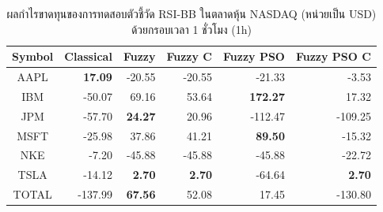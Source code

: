 \begin{table}[!htb]
    \centering
    \begin{tabular}{crrrrr}
        \hline
        \textbf{Symbol} & \textbf{Classical} & \textbf{Fuzzy} & \textbf{Fuzzy C} & \textbf{Fuzzy PSO} & \textbf{Fuzzy PSO C} \\ \hline
        AAPL            & \textbf{17.09}     & -20.55         & -20.55           & -21.33             & -3.53                \\ \hline
        IBM             & -50.07             & 69.16          & 53.64            & \textbf{172.27}    & 17.32                \\ \hline
        JPM             & -57.70             & \textbf{24.27} & 20.96            & -112.47            & -109.25              \\ \hline
        MSFT            & -25.98             & 37.86          & 41.21            & \textbf{89.50}     & -15.32               \\ \hline
        NKE             & -7.20              & -45.88         & -45.88           & -45.88             & -22.72               \\ \hline
        TSLA            & -14.12             & \textbf{2.70}  & \textbf{2.70}    & -64.64             &
        \textbf{2.70}                                                                                                        \\ \hline
        TOTAL           & -137.99            & \textbf{67.56} & 52.08            & 17.45              & -130.80              \\ \hline
    \end{tabular}
    \caption{ผลกำไรขาดทุนของการทดสอบตัวชี้วัด RSI-BB ในตลาดหุ้น NASDAQ (หน่วยเป็น USD) ด้วยกรอบเวลา 1 ชั่วโมง (1h)}
    \label{tab:rsi-bb-stocks}
\end{table}

